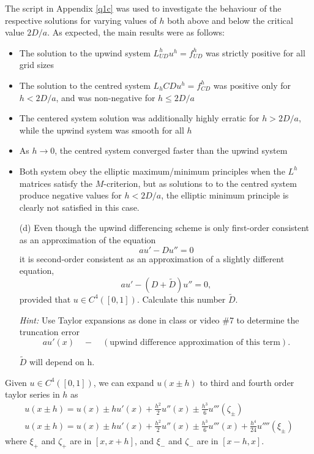 \begin{problem}{1}
\begin{solution}
The script in Appendix \ref{q1c} was used to investigate the behaviour
of the respective solutions for varying values of $h$ both above and
below the critical value $2D/a$. As expected, the main results were as follows:
\begin{itemize}
    \item The solution to the upwind system $L^h_{UD} u^h = f^h_{UD}$
    was strictly positive for all grid sizes
    \item The solution to the centred system $L_h{CD} u^h = f^h_{CD}$
    was positive only for $h<2D/a$, and was non-negative for $h\leq 2D/a$
    \item The centered system solution was additionally highly erratic
    for $h>2D/a$, while the upwind system was smooth for all $h$
    \item As $h\rightarrow 0$, the centred system converged faster than
    the upwind system
    \item Both system obey the elliptic maximum/minimum principles when
    the $L^h$ matrices satisfy the $M$-criterion, but as solutions to
    to the centred system produce negative values for $h<2D/a$, the
    elliptic minimum principle is clearly not satisfied in this case.
\end{itemize}

\end{solution}
\pagebreak


\begin{itemize}
	\item[(d)] Even though the upwind differencing scheme is only
	first-order consistent as an approximation of the equation
	$$ a u' - D u'' = 0 $$
	it is second-order consistent as an approximation of a slightly
	different equation,
	$$ a u' - (D + \tilde{D}) u'' = 0, $$
	provided that $u \in C^4([0,1])$. Calculate this number
	$\tilde{D}$.
	
	\textit{Hint:} Use Taylor expansions as done in class or
	video \#7 to determine the truncation error
	$$ a u'(x) \quad - \quad
	(\text{upwind difference approximation of this term}).$$
	
	$\tilde{D}$ will depend on h.
\end{itemize}

\begin{solution}
Given $u \in C^4([0,1])$, we can expand $u(x\pm h)$ to third and
fourth order taylor series in $h$ as
\begin{gather}
    u(x\pm h) = u(x) \pm h u'(x) + \frac{h^2}{2} u''(x) \pm 
    \frac{h^3}{6} u'''(\zeta_\pm)\label{u_3rd} \\
    u(x\pm h) = u(x) \pm h u'(x) + \frac{h^2}{2} u''(x) \pm 
    \frac{h^3}{6} u'''(x) + \frac{h^4}{24}u''''(\xi_\pm)\label{u_4th}
\end{gather}
where $\xi_+$ and $\zeta_+$ are in $[x,x+h]$, and 
$\xi_-$ and $\zeta_-$ are in $[x-h,x]$.


\end{solution}
\end{problem}
